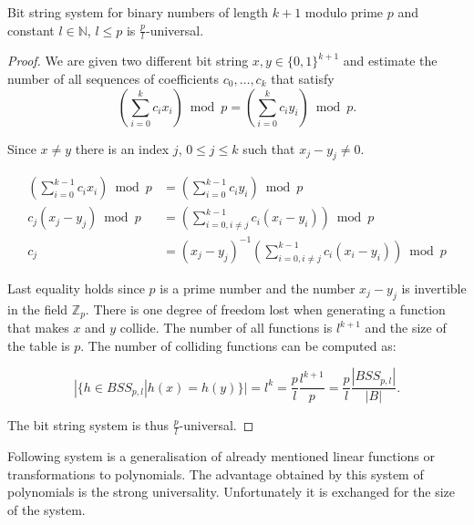 \begin{remark}
Bit string system for binary numbers of length $k + 1$ modulo prime $p$ and constant $l \in \mathbb{N}$, $l \leq p$ is $\frac{p}{l}$-universal.
\end{remark}
\begin{proof}
We are given two different bit string $x, y \in \{0, 1\} ^ {k + 1}$ and estimate the number of all sequences of coefficients $c_0, \dots, c_k$ that satisfy
\[
\left( \displaystyle \sum_{i = 0}^{k} c_i x_i \right) \bmod p = \left( \displaystyle \sum_{i = 0}^{k} c_i y_i \right) \bmod p \textit{.}
\]

Since $x \neq y$ there is an index $j$, $0 \leq j \leq k$ such that $x_j - y_j \neq 0$.

\begin{displaymath}
\begin{split}
\left(\displaystyle \sum_{i=0}^{k-1} c_i x_i\right) \bmod p & = \left(\displaystyle \sum_{i=0}^{k-1} c_i y_i\right) \bmod p \\
c_j(x_j - y_j) \bmod p & = \left(\displaystyle \sum_{i=0, i \neq j}^{k-1} c_i (x_i - y_i)\right) \bmod p \\
c_j & = (x_j - y_j) ^ {-1}\left(\displaystyle \sum_{i=0, i \neq j}^{k-1} c_i (x_i - y_i)\right) \bmod p
\end{split}
\end{displaymath}

Last equality holds since $p$ is a prime number and the number $x_j - y_j$ is invertible in the field $\mathbb{Z}_p$. There is one degree of freedom lost when generating a function that makes $x$ and $y$ collide. The number of all functions is $l ^ {k + 1}$ and the size of the table is $p$. The number of colliding functions can be computed as:

\begin{displaymath}
|\{h \in BSS_{p, l} | h(x) = h(y) \}| = l^{k} = \frac{p}{l}\frac{l^{k + 1}}{p} = \frac{p}{l}\frac{|BSS_{p, l}|}{|B|} \textit{.}
\end{displaymath}

The bit string system is thus $\frac{p}{l}$-universal.
\end{proof}

Following system is a generalisation of already mentioned linear functions or transformations to polynomials. The advantage obtained by this system of polynomials is the strong universality. Unfortunately it is exchanged for the size of the system.

